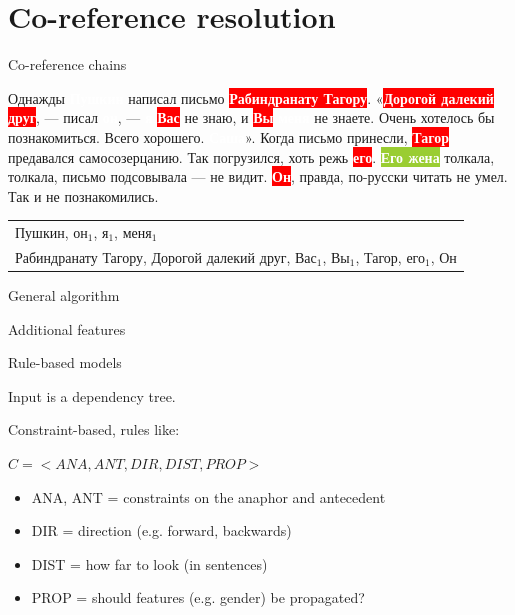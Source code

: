 \documentclass[dvipsnames, 10pt, compress]{beamer}
\newcommand{\redfillbox}[1]{\colorbox{red}{\textcolor{white}{{\bf #1}}}}
\newcommand{\bluefillbox}[1]{\colorbox{ProcessBlue}{\textcolor{white}{{\bf #1}}}}
\newcommand{\greenfillbox}[1]{\colorbox{YellowGreen}{\textcolor{white}{{\bf #1}}}}
\begin{document}
\section{Co-reference resolution}


\begin{frame}


\end{frame}


\begin{frame}{Co-reference chains}

Однажды \bluefillbox{Пушкин} написал письмо \redfillbox{Рабиндранату Тагору}. 
«\redfillbox{Дорогой далекий друг}, — писал \bluefillbox{он}, — \bluefillbox{я} \redfillbox{Вас} не знаю, и \redfillbox{Вы} \bluefillbox{меня} не знаете.
Очень хотелось бы познакомиться. Всего хорошего. \bluefillbox{Саша}».
Когда письмо принесли, \redfillbox{Тагор} предавался самосозерцанию. 
Так погрузился, хоть режь \redfillbox{его}. 
\greenfillbox{Его жена} толкала, толкала, письмо подсовывала — не видит. 
\redfillbox{Он}, правда, по-русски читать не умел. Так и не познакомились.

\begin{tabular}{l}
{ Пушкин, он$_1$, я$_1$, меня$_1$ } \\ 
{ Рабиндранату Тагору, Дорогой далекий друг, Вас$_1$, Вы$_1$, Тагор, его$_1$, Он} \\
\end{tabular}

\end{frame}

\begin{frame}{General algorithm}

\end{frame}


\begin{frame}{Additional features}

\end{frame}


\begin{frame}{Rule-based models} %

Input is a dependency tree.

Constraint-based, rules like:

$C = <ANA,  ANT,  DIR, DIST, PROP>$

\begin{itemize}
  \item ANA, ANT = constraints on the anaphor and antecedent
  \item DIR = direction (e.g. forward, backwards)
  \item DIST = how far to look (in sentences)
  \item PROP = should features (e.g. gender) be propagated?
\end{itemize}

\end{frame}
\end{document}

